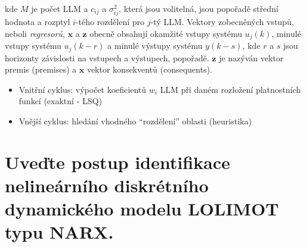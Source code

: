 \documentclass{article}
\begin{document}
	kde $M$ je počet LLM a $c_{ij}$ a $\sigma^2_{ij}$, která jsou volitelná, jsou popořadě střední hodnota a rozptyl $i$-tého rozdělení pro $j$-tý LLM. Vektory zobecněných vstupů, neboli \emph{regresorů}, $\bm{x}$ a $\bm{z}$ obecně obsahují okamžité vstupy systému $u_j(k)$, minulé vstupy systému $u_j(k-r)$ a minulé výstupy systému $y(k-s)$, kde $r$ a $s$ jsou horizonty závislosti na vstupech a výstupech, popořadě. $\bm{z}$ je nazýván vektor premis (premises) a $\bm{x}$ vektor konsekventů (consequents).

	\begin{itemize}
	\item Vnitřní cyklus: výpočet koeficientů $w_i$ LLM při daném rozložení platnostních funkcí (exaktní - LSQ)
	\item Vnější cyklus: hledání vhodného ``rozdělení'' oblasti (heuristika)
	\end{itemize}

	\pagebreak
	\section{Uveďte postup identifikace nelineárního diskrétního dynamického modelu LOLIMOT typu NARX. }
\end{document}
